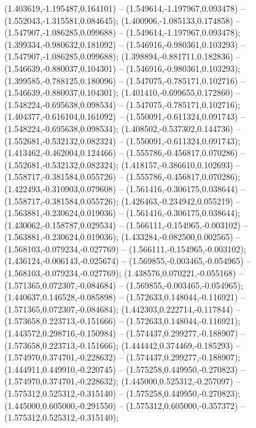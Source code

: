  (1.403619,-1.195487,0.164101) -- (1.549614,-1.197967,0.093478) -- (1.552043,-1.315581,0.084645);
 (1.400906,-1.085133,0.174858) -- (1.547907,-1.086285,0.099688) -- (1.549614,-1.197967,0.093478);
 (1.399334,-0.980632,0.181092) -- (1.546916,-0.980361,0.103293) -- (1.547907,-1.086285,0.099688);
 (1.398894,-0.881711,0.182836) -- (1.546639,-0.880037,0.104301) -- (1.546916,-0.980361,0.103293);
 (1.399585,-0.788125,0.180096) -- (1.547075,-0.785171,0.102716) -- (1.546639,-0.880037,0.104301);
 (1.401410,-0.699655,0.172860) -- (1.548224,-0.695638,0.098534) -- (1.547075,-0.785171,0.102716);
 (1.404377,-0.616104,0.161092) -- (1.550091,-0.611324,0.091743) -- (1.548224,-0.695638,0.098534);
 (1.408502,-0.537302,0.144736) -- (1.552681,-0.532132,0.082324) -- (1.550091,-0.611324,0.091743);
 (1.413462,-0.462004,0.124466) -- (1.555786,-0.456817,0.070286) -- (1.552681,-0.532132,0.082324);
 (1.418157,-0.386610,0.102693) -- (1.558717,-0.381584,0.055726) -- (1.555786,-0.456817,0.070286);
 (1.422493,-0.310903,0.079608) -- (1.561416,-0.306175,0.038644) -- (1.558717,-0.381584,0.055726);
 (1.426463,-0.234942,0.055219) -- (1.563881,-0.230624,0.019036) -- (1.561416,-0.306175,0.038644);
 (1.430062,-0.158787,0.029534) -- (1.566111,-0.154965,-0.003102) -- (1.563881,-0.230624,0.019036);
 (1.433284,-0.082500,0.002565) -- (1.568103,-0.079234,-0.027769) -- (1.566111,-0.154965,-0.003102);
 (1.436124,-0.006143,-0.025674) -- (1.569855,-0.003465,-0.054965) -- (1.568103,-0.079234,-0.027769);
 (1.438576,0.070221,-0.055168) -- (1.571365,0.072307,-0.084684) -- (1.569855,-0.003465,-0.054965);
 (1.440637,0.146528,-0.085898) -- (1.572633,0.148044,-0.116921) -- (1.571365,0.072307,-0.084684);
 (1.442303,0.222714,-0.117844) -- (1.573658,0.223713,-0.151666) -- (1.572633,0.148044,-0.116921);
 (1.443572,0.298716,-0.150984) -- (1.574437,0.299277,-0.188907) -- (1.573658,0.223713,-0.151666);
 (1.444442,0.374469,-0.185293) -- (1.574970,0.374701,-0.228632) -- (1.574437,0.299277,-0.188907);
 (1.444911,0.449910,-0.220745) -- (1.575258,0.449950,-0.270823) -- (1.574970,0.374701,-0.228632);
 (1.445000,0.525312,-0.257097) -- (1.575312,0.525312,-0.315140) -- (1.575258,0.449950,-0.270823);
 (1.445000,0.605000,-0.291550) -- (1.575312,0.605000,-0.357372) -- (1.575312,0.525312,-0.315140);
